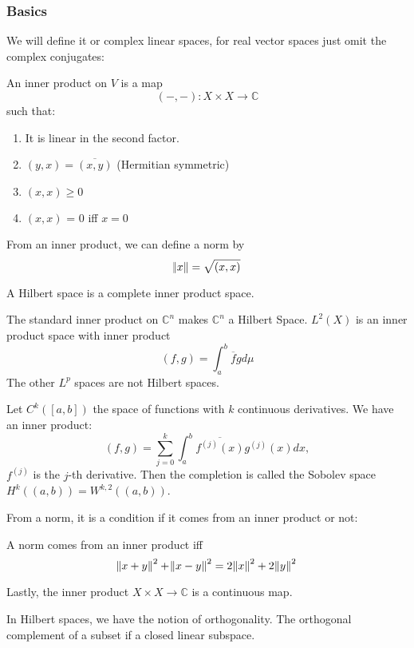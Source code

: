 \documentclass[main.tex]{subfiles}
\begin{document}
\subsubsection{Basics}
We will define it or complex linear spaces, for real vector spaces just omit the complex conjugates:

\begin{definition}
An inner product on $V$ is a map 
$$
(-, -): X \times X \rightarrow \mathbb{C}
$$
such that:
\begin{enumerate}
    \item It is linear in the second factor.
    \item $(y,x) = \overline{(x,y)}$ (Hermitian symmetric)
    \item $(x,x) \geq 0$
    \item $(x,x)$ = 0 iff $x = 0$
\end{enumerate}
\end{definition}

From an inner product, we can define a norm by 
$$
\norm{x} = \sqrt{(x,x)}
$$

\begin{definition}
A Hilbert space is a complete inner product space.
\end{definition}

\begin{example}
The standard inner product on $\mathbb{C}^n$ makes $\mathbb{C}^n$ a Hilbert Space. $L^2(X)$ is an inner product space with inner product
$$
(f,g) = \int_a ^b \overline{f}g d\mu
$$
The other $L^p$ spaces are not Hilbert spaces.

Let $C^k([a,b])$ the space of functions with $k$ continuous derivatives. We have an inner product:
$$
(f,g) = \sum_{j=0} ^k \int_a ^b \overline{f^{(j)}(x)} g^{(j)}(x) dx,
$$
$f^{(j)}$ is the $j$-th derivative. Then the completion is called the Sobolev space $H^k((a,b)) = W^{k,2}((a,b))$.
\end{example}

From a norm, it is a condition if it comes from an inner product or not:

\begin{theorem}
A norm comes from an inner product iff 
$$
\norm{x + y}^2 + \norm{x - y}^2 = 2\norm{x}^2 + 2\norm{y}^2
$$
\end{theorem}

Lastly, the inner product $X \times X \rightarrow \mathbb{C}$ is a continuous map.

In Hilbert spaces, we have the notion of orthogonality. The orthogonal complement of a subset if a closed linear subspace.
\end{document}
